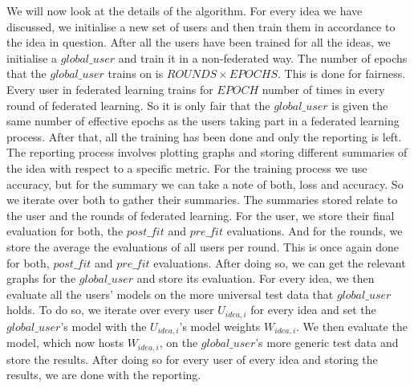 \documentclass[12pt]{article}
\begin{document}
We will now look at the details of the algorithm. For every idea we have discussed, we initialise a new set of users and then train them in accordance to the idea in question. After all the users have been trained for all the ideas, we initialise a $global\_user$ and train it in a non-federated way. The number of epochs that the $global\_user$ trains on is $ROUNDS \times EPOCHS$. This is done for fairness. Every user in federated learning trains for $EPOCH$ number of times in every round of federated learning. So it is only fair that the $global\_user$ is given the same number of effective epochs as the users taking part in a federated learning process. After that, all the training has been done and only the reporting is left. The reporting process involves plotting graphs and storing different summaries of the idea with respect to a specific metric. For the training process we use accuracy, but for the summary we can take a note of both, loss and accuracy. So we iterate over both to gather their summaries. The summaries stored relate to the user and the rounds of federated learning. For the user, we store their final evaluation for both, the $post\_fit$ and $pre\_fit$ evaluations. And for the rounds, we store the average the evaluations of all users per round. This is once again done for both, $post\_fit$ and $pre\_fit$ evaluations. After doing so, we can get the relevant graphs for the $global\_user$ and store its evaluation. For every idea, we then evaluate all the users' models on the more universal test data that $global\_user$ holds. To do so, we iterate over every user $U_{idea, i}$ for every idea and set the $global\_user$'s model with the $U_{idea, i}$'s model weights $W_{idea, i}$. We then evaluate the model, which now hosts $W_{idea, i}$, on the $global\_user$'s more generic test data and store the results. After doing so for every user of every idea and storing the results, we are done with the reporting. 
\end{document}

